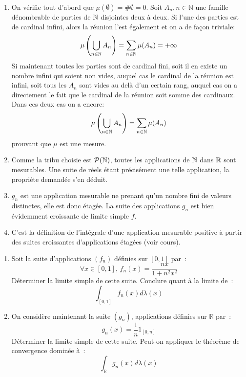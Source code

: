 \documentclass[a4paper, 12pt]{amsart}
\begin{document}
\begin{enumerate}
 \item On vérifie tout d'abord que $\mu(\emptyset)=\#\emptyset = 0$. Soit
$A_n,n\in \mathbb{N}$ une famille dénombrable de parties de $\mathbb{N}$ disjointes
deux à deux. Si l'une des parties est de cardinal infini, alors la réunion
l'est également et on a de façon triviale:
\[
\mu\left(\bigcup_{n \in \mathbb{N}}A_n\right) = \sum_{n \in \mathbb{N}} \mu(A_n) =+\infty
\]
Si maintenant toutes les parties sont de cardinal fini, soit il en existe un
nombre infini qui soient non vides, auquel cas le cardinal de la réunion est
infini, soit tous les $A_n$ sont vides au delà d'un certain rang, auquel cas on
a directement le fait que le cardinal de la réunion soit somme des cardinaux.
Dans ces deux cas on a encore:
\[
\mu\left(\bigcup_{n \in \mathbb{N}}A_n\right) = \sum_{n \in \mathbb{N}} \mu(A_n)
\]
prouvant que $\mu$ est une mesure.
\item Comme la tribu choisie est $\mathcal{P}(\mathbb{N})$, toutes les applications de
$\mathbb{N}$ dans $\mathbb{R}$ sont mesurables. Une suite de réels étant précisément une telle
application, la propriéte demandée s'en déduit.
\item $g_n$ est une application mesurable ne prenant qu'un nombre fini de
valeurs distinctes, elle est donc étagée. La suite des applications $g_n$ est
bien évidemment croissante de limite simple $f$.
\item C'est la définition de l'intégrale d'une application mesurable positive à
partir des suites croissantes d'applications étagées (voir cours).
\end{enumerate}
\begin{fex}
 \begin{enumerate}
\item Soit la suite d'applications $(f_n)$ définies sur $[0,1]$ par~:
\[
\forall x \in [0,1], \, f_n(x) = \frac{nx}{1+n^2x^2}
\]
Déterminer la limite simple de cette suite. Conclure quant à la limite de~:
\[
\int_{[0,1]} f_n(x) d \lambda(x)
\]
\item On considère maintenant la suite $(g_n)$, applications définies sur
$\mathbb{R}$ par~:
\[
g_n(x) = \frac{1}{n} 1_{[0, n]}
\]
Déterminer la limite simple de cette suite. Peut-on appliquer le théorème de
convergence
dominée à~:
\[
\int_{\mathbb{R}} g_n(x) d\lambda(x)
\]
\end{enumerate}
\end{fex}
\end{document}
